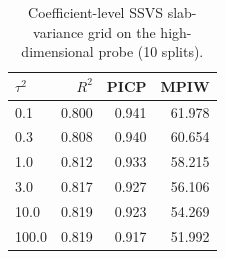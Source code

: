 \begin{table}[htbp]
\centering
\caption{Coefficient-level SSVS slab-variance grid on the high-dimensional probe (10 splits).}
\label{tab:highdimtau}
\scriptsize
\begin{tabular}{lrrr}
\toprule
$\tau^2$ & $R^2$ & PICP & MPIW \\
\midrule
0.1 & 0.800 & 0.941 & 61.978 \\
0.3 & 0.808 & 0.940 & 60.654 \\
1.0 & 0.812 & 0.933 & 58.215 \\
3.0 & 0.817 & 0.927 & 56.106 \\
10.0 & 0.819 & 0.923 & 54.269 \\
100.0 & 0.819 & 0.917 & 51.992 \\
\bottomrule
\end{tabular}
\end{table}
